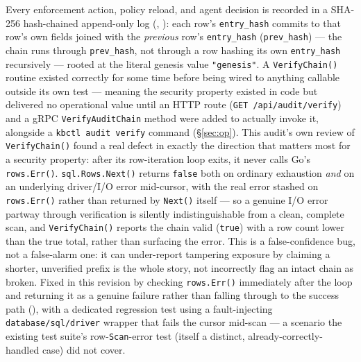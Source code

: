\documentclass{article}
\begin{document}
Every enforcement action, policy reload, and agent decision is recorded
in a SHA-256 hash-chained append-only log (,
): each row's \texttt{entry\_hash} commits to that
row's own fields joined with the \emph{previous} row's
\texttt{entry\_hash} (\texttt{prev\_hash}) --- the chain runs through
\texttt{prev\_hash}, not through a row hashing its own
\texttt{entry\_hash} recursively --- rooted at the literal genesis
value \texttt{"genesis"}. A \texttt{VerifyChain()} routine existed
correctly for some time before being wired to anything callable
outside its own test --- meaning the security property existed in code
but delivered no operational value until an HTTP route
(\texttt{GET /api/audit/verify}) and a gRPC \texttt{VerifyAuditChain}
method were added to actually invoke it, alongside a
\texttt{kbctl audit verify} command (\S\ref{sec:op}). This audit's own
review of \texttt{VerifyChain()} found a real defect in exactly the
direction that matters most for a security property: after its
row-iteration loop exits, it never calls Go's \texttt{rows.Err()}.
\texttt{sql.Rows.Next()} returns \texttt{false} both on ordinary
exhaustion \emph{and} on an underlying driver/I/O error mid-cursor, with
the real error stashed on \texttt{rows.Err()} rather than returned by
\texttt{Next()} itself --- so a genuine I/O error partway through
verification is silently indistinguishable from a clean, complete scan,
and \texttt{VerifyChain()} reports the chain valid (\texttt{true}) with
a row count lower than the true total, rather than surfacing the
error. This is a false-confidence bug, not a false-alarm one: it can
under-report tampering exposure by claiming a shorter, unverified
prefix is the whole story, not incorrectly flag an intact chain as
broken. Fixed in this revision by checking \texttt{rows.Err()}
immediately after the loop and returning it as a genuine failure rather
than falling through to the success path (), with
a dedicated regression test using a fault-injecting
\texttt{database/sql/driver} wrapper that fails the cursor mid-scan ---
a scenario the existing test suite's row-\texttt{Scan}-error test
(itself a distinct, already-correctly-handled case) did not cover.
\end{document}
